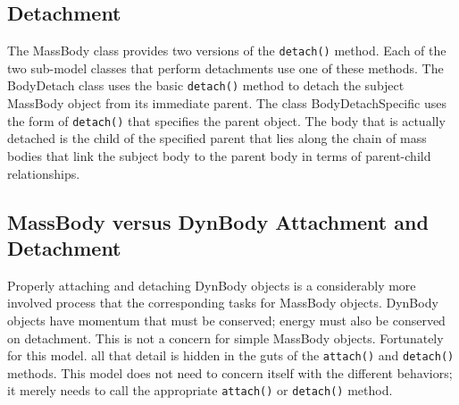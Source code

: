 \subsection{Detachment}
The MassBody class provides two versions of the {\tt detach()} method.
Each of the two sub-model classes that perform detachments use one
of these methods. The BodyDetach class uses the basic {\tt detach()}
method to detach the subject MassBody object from its immediate parent.
The class BodyDetachSpecific uses the form of {\tt detach()}
that specifies the parent object. The body that is actually detached
is the child of the specified parent that lies along the chain of mass bodies
that link the subject body to the parent body in terms of parent-child
relationships.

\subsection{MassBody versus DynBody Attachment and Detachment}
Properly attaching and detaching DynBody objects is a considerably more
involved process that the corresponding tasks for MassBody objects.
DynBody objects have momentum that must be conserved; energy must also
be conserved on detachment. This is not a concern for simple MassBody objects.
Fortunately for this model. all that detail is hidden in the guts of the
{\tt attach()} and {\tt detach()} methods. This model does not need to concern
itself with the different behaviors; it merely needs to call the appropriate
{\tt attach()} or {\tt detach()} method.
